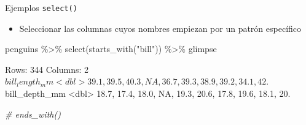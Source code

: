 \documentclass[
  ignorenonframetext,
  aspectratio=169]{beamer}
\newenvironment{Shaded}{\begin{snugshade}}{\end{snugshade}}
\newcommand{\CommentTok}[1]{\textcolor[rgb]{0.56,0.35,0.01}{\textit{#1}}}
\newcommand{\FunctionTok}[1]{\textcolor[rgb]{0.00,0.00,0.00}{#1}}
\newcommand{\NormalTok}[1]{#1}
\newcommand{\SpecialCharTok}[1]{\textcolor[rgb]{0.00,0.00,0.00}{#1}}
\newcommand{\StringTok}[1]{\textcolor[rgb]{0.31,0.60,0.02}{#1}}
\providecommand{\tightlist}{%
  \setlength{\itemsep}{0pt}\setlength{\parskip}{0pt}}
\let\oldverbatim\verbatim
\let\endoldverbatim\endverbatim
\renewenvironment{verbatim}{\tiny\oldverbatim}{\endoldverbatim}
\begin{document}
\begin{frame}[fragile]{Ejemplos \texttt{select()}}
\protect\hypertarget{ejemplos-select-3}{}
\begin{itemize}
\tightlist
\item
  Seleccionar las columnas cuyos nombres empiezan por un patrón
  específico\\
\end{itemize}

\begin{Shaded}
\begin{Highlighting}[]
\NormalTok{penguins }\SpecialCharTok{\%\textgreater{}\%} 
  \FunctionTok{select}\NormalTok{(}\FunctionTok{starts\_with}\NormalTok{(}\StringTok{"bill"}\NormalTok{)) }\SpecialCharTok{\%\textgreater{}\%} 
\NormalTok{  glimpse}
\end{Highlighting}
\end{Shaded}

\begin{verbatim}
Rows: 344
Columns: 2
$ bill_length_mm <dbl> 39.1, 39.5, 40.3, NA, 36.7, 39.3, 38.9, 39.2, 34.1, 42.~
$ bill_depth_mm  <dbl> 18.7, 17.4, 18.0, NA, 19.3, 20.6, 17.8, 19.6, 18.1, 20.~
\end{verbatim}

\begin{Shaded}
\begin{Highlighting}[]
\CommentTok{\# ends\_with()}
\end{Highlighting}
\end{Shaded}
\end{frame}

\end{document}

